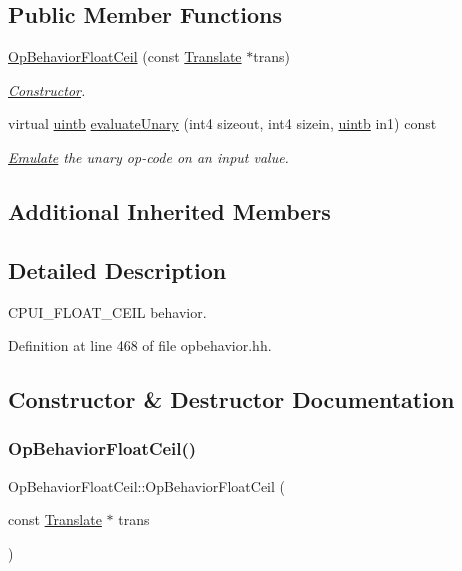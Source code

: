\subsection*{Public Member Functions}
\begin{DoxyCompactItemize}
\item 
\mbox{\hyperlink{class_op_behavior_float_ceil_ab751e10e04910d962a503a950168da1e}{Op\+Behavior\+Float\+Ceil}} (const \mbox{\hyperlink{class_translate}{Translate}} $\ast$trans)
\begin{DoxyCompactList}\small\item\em \mbox{\hyperlink{class_constructor}{Constructor}}. \end{DoxyCompactList}\item 
virtual \mbox{\hyperlink{types_8h_a2db313c5d32a12b01d26ac9b3bca178f}{uintb}} \mbox{\hyperlink{class_op_behavior_float_ceil_a681f8504d31c13890468933fd370bf21}{evaluate\+Unary}} (int4 sizeout, int4 sizein, \mbox{\hyperlink{types_8h_a2db313c5d32a12b01d26ac9b3bca178f}{uintb}} in1) const
\begin{DoxyCompactList}\small\item\em \mbox{\hyperlink{class_emulate}{Emulate}} the unary op-\/code on an input value. \end{DoxyCompactList}\end{DoxyCompactItemize}
\subsection*{Additional Inherited Members}


\subsection{Detailed Description}
C\+P\+U\+I\+\_\+\+F\+L\+O\+A\+T\+\_\+\+C\+E\+IL behavior. 

Definition at line 468 of file opbehavior.\+hh.



\subsection{Constructor \& Destructor Documentation}
\mbox{\label{class_op_behavior_float_ceil_ab751e10e04910d962a503a950168da1e}} 
\subsubsection{\texorpdfstring{OpBehaviorFloatCeil()}{OpBehaviorFloatCeil()}}
{\footnotesize\ttfamily Op\+Behavior\+Float\+Ceil\+::\+Op\+Behavior\+Float\+Ceil (\begin{DoxyParamCaption}\item[{const \mbox{\hyperlink{class_translate}{Translate}} $\ast$}]{trans }\end{DoxyParamCaption})\hspace{0.3cm}{\ttfamily [inline]}}



